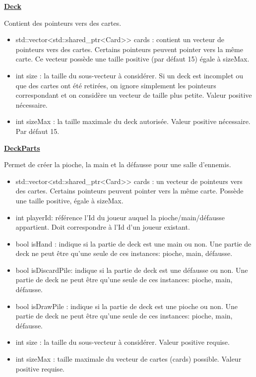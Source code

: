 \underline{\textbf{Deck}}
\par Contient des pointeurs vers des cartes. 
\begin{itemize}
    \item std::vector<std::shared\_ptr<Card>> cards : contient un vecteur de pointeurs vers des cartes. Certains pointeurs peuvent pointer vers la même carte. Ce vecteur possède une taille positive (par défaut 15) égale à sizeMax.
    \item int size : la taille du sous-vecteur à considérer. Si un deck est incomplet ou que des cartes ont été retirées, on ignore simplement les pointeurs correspondant et on considère un vecteur de taille plus petite. Valeur positive nécessaire.
    \item int sizeMax : la taille maximale du deck autorisée. Valeur positive nécessaire. Par défaut 15.
\end{itemize}

\underline{\textbf{DeckParts}}
\par Permet de créer la pioche, la main et la défausse pour une salle d'ennemis.

\begin{itemize}
    \item std::vector<std::shared\_ptr<Card>> cards : un vecteur de pointeurs vers des cartes. Certains pointeurs peuvent pointer vers la même carte. Possède une taille positive, égale à sizeMax.
    \item int playerId: référence l'Id du joueur auquel la pioche/main/défausse appartient. Doit correspondre à l'Id d'un joueur existant.
    \item bool isHand : indique si la partie de deck est une main ou non. Une partie de deck ne peut être qu'une seule de ces instances: pioche, main, défausse.
    \item bool isDiscardPile: indique si la partie de deck est une défausse ou non. Une partie de deck ne peut être qu'une seule de ces instances: pioche, main, défausse.
    \item bool isDrawPile : indique si la partie de deck est une pioche ou non. Une partie de deck ne peut être qu'une seule de ces instances: pioche, main, défausse.
    \item int size : la taille du sous-vecteur à considérer. Valeur positive requise.
    \item int sizeMax : taille maximale du vecteur de cartes (cards) possible. Valeur positive requise.
\end{itemize}

